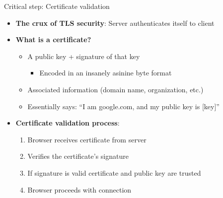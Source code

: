 \documentclass[aspectratio=169, lualatex, handout]{beamer}
\begin{document}
\begin{frame}{Critical step: Certificate validation}
	\begin{itemize}[<+->]
		\item \textbf{The crux of TLS security}: Server authenticates itself to client
		\item \textbf{What is a certificate?}
		      \begin{itemize}
			      \item A public key + signature of that key
			            \begin{itemize}
				            \item Encoded in an insanely asinine byte format
			            \end{itemize}
			      \item Associated information (domain name, organization, etc.)
			      \item Essentially says: ``I am google.com, and my public key is [key]''
		      \end{itemize}
		\item \textbf{Certificate validation process}:
		      \begin{enumerate}
			      \item Browser receives certificate from server
			      \item Verifies the certificate's signature
			      \item If signature is valid \rightarrow certificate and public key are trusted
			      \item Browser proceeds with connection
		      \end{enumerate}
	\end{itemize}
\end{frame}
\end{document}
